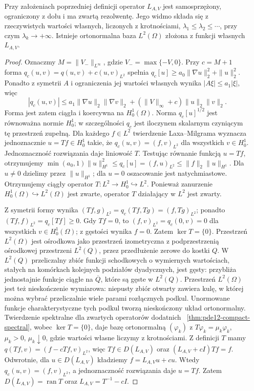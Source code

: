 \begin{twierdzenie}
\label{thm:pde18-compact}
Przy założeniach poprzedniej definicji operator $L_{A,V}$
jest samosprzężony, ograniczony z dołu i ma zwartą
rezolwentę. Jego widmo składa się
z rzeczywistych wartości własnych, liczonych z krotnościami,
$\lambda_1\le\lambda_2\le\cdots$, przy czym
$\lambda_k\to+\infty$. Istnieje ortonormalna baza
$L^2(\Omega)$ złożona z funkcji własnych $L_{A,V}$.
\end{twierdzenie}
\begin{proof}
Oznaczmy $M=\|V_-\|_{L^\infty}$, gdzie
$V_-=\max\{-V,0\}$. Przy $c=M+1$ forma
$q_c(u,v)=q(u,v)+c(u,v)_{L^2}$ spełnia
$q_c[u]\ge a_0\|\nabla u\|_2^2+\|u\|_2^2$.
Ponadto z symetrii $A$ i ograniczenia jej wartości własnych
wynika $|A\xi|\le a_1|\xi|$, więc
\[
 |q_c(u,v)|\le a_1\|\nabla u\|_2\|\nabla v\|_2
 +(\|V\|_\infty+c)\|u\|_2\|v\|_2.
\]
Forma jest zatem ciągła i koercywna na $H_0^1(\Omega)$.
Norma $q_c[u]^{1/2}$ jest równoważna normie $H_0^1$;
w szczególności $q_c$ jest iloczynem skalarnym
czyniącym tę przestrzeń zupełną.
Dla każdego $f\in L^2$ twierdzenie Laxa--Milgrama
wyznacza jednoznacznie $u=T f\in H_0^1$ takie, że
$q_c(u,v)=(f,v)_{L^2}$ dla wszystkich $v\in H_0^1$.
Jednoznaczność rozwiązania daje liniowość $T$.
Testując równanie funkcją $u=Tf$, otrzymujemy
$\min(a_0,1)\|u\|_{H^1}^2\le q_c[u]
=(f,u)_{L^2}\le\|f\|_2\|u\|_{H^1}$.
Dla $u\ne0$ dzielimy przez $\|u\|_{H^1}$; dla $u=0$
oszacowanie jest natychmiastowe.
Otrzymujemy ciągły operator $T:L^2\to H_0^1\hookrightarrow L^2$.
Ponieważ zanurzenie $H_0^1(\Omega)\hookrightarrow L^2(\Omega)$
jest zwarte, operator $T$ działający w $L^2$ jest zwarty.

Z symetrii formy wynika
$(Tf,g)_{L^2}=q_c(Tf,Tg)=(f,Tg)_{L^2}$;
ponadto $(Tf,f)_{L^2}=q_c[Tf]\ge0$. Gdy $Tf=0$,
to $(f,v)_{L^2}=q_c(0,v)=0$ dla wszystkich
$v\in H_0^1(\Omega)$; z gęstości wynika $f=0$.
Zatem $\ker T=\{0\}$.
Przestrzeń $L^2(\Omega)$ jest ośrodkowa jako przestrzeń
izometryczna z podprzestrzenią ośrodkowej przestrzeni
$L^2(Q)$, przez przedłużenie zerowe do kostki $Q$.
W $L^2(Q)$ przeliczalny zbiór funkcji schodkowych
o wymiernych wartościach, stałych na komórkach kolejnych
podziałów dyadycznych, jest gęsty: przybliża jednostajnie
funkcje ciągłe na $\overline Q$, które są gęste w $L^2(Q)$.
Przestrzeń $L^2(\Omega)$ jest też nieskończenie wymiarowa:
niepusty zbiór otwarty zawiera kulę, w której można wybrać
przeliczalnie wiele parami rozłącznych podkul. Unormowane
funkcje charakterystyczne tych podkul tworzą nieskończony
układ ortonormalny.
Twierdzenie spektralne dla zwartych operatorów dodatnich
~\ref{thm:pde12-compact-spectral}, wobec $\ker T=\{0\}$,
daje bazę ortonormalną
$(\varphi_k)$ z $T\varphi_k=\mu_k\varphi_k$,
$\mu_k>0$, $\mu_k\downarrow0$, gdzie wartości własne
liczymy z krotnościami. Z definicji $T$ mamy $q(Tf,v)=(f-cTf,v)_{L^2}$,
więc $Tf\in D(L_{A,V})$ oraz $(L_{A,V}+cI)Tf=f$.
Odwrotnie, dla $u\in D(L_{A,V})$ kładziemy
$f=L_{A,V}u+cu$. Wtedy $q_c(u,v)=(f,v)_{L^2}$,
a jednoznaczność rozwiązania daje $u=Tf$.
Zatem $D(L_{A,V})=\operatorname{ran}T$ oraz
$L_{A,V}=T^{-1}-cI$.


\end{proof}
